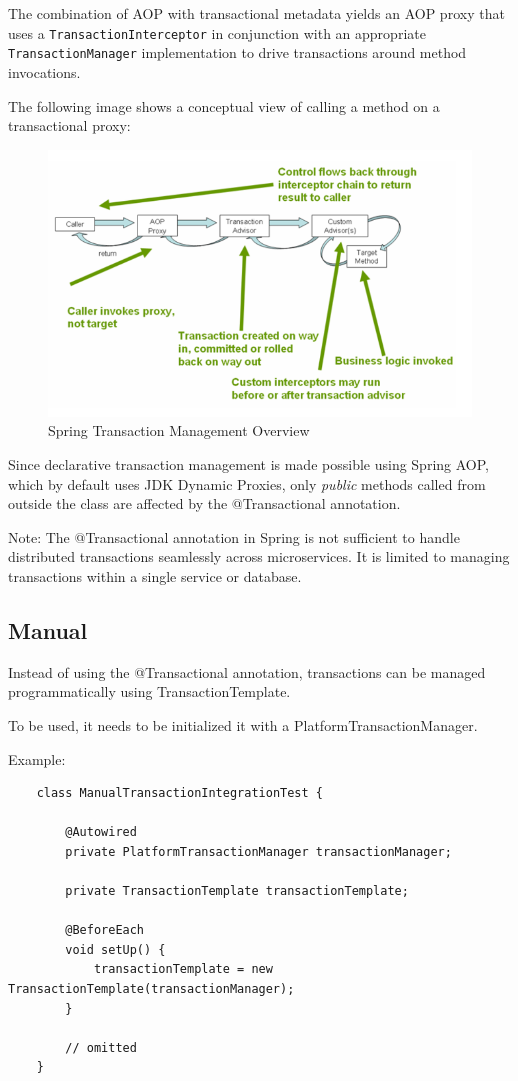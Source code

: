 \documentclass{scrartcl}
\begin{document}
The combination of AOP with transactional metadata yields an AOP proxy that uses a \lstinline|TransactionInterceptor| in conjunction with an appropriate \lstinline|TransactionManager| implementation to drive transactions around method invocations.

The following image shows a conceptual view of calling a method on a transactional proxy:

\begin{figure}[h]
    \centering
    \includegraphics[width=1\linewidth]{transactions-aop}
    \caption{Spring Transaction Management Overview}
    \label{fig:transactions-aop}
\end{figure}

Since declarative transaction management is made possible using Spring AOP, which by default uses JDK Dynamic Proxies, only \textit{public} methods called from outside the class are affected by the @Transactional annotation.

Note: The @Transactional annotation in Spring is not sufficient to handle distributed transactions seamlessly across microservices. It is limited to managing transactions within a single service or database.


\subsection{Manual}

Instead of using the @Transactional annotation, transactions can be managed programmatically using TransactionTemplate.

To be used, it needs to be initialized it with a PlatformTransactionManager.

Example:

\begin{lstlisting}
    class ManualTransactionIntegrationTest {

        @Autowired
        private PlatformTransactionManager transactionManager;

        private TransactionTemplate transactionTemplate;

        @BeforeEach
        void setUp() {
            transactionTemplate = new TransactionTemplate(transactionManager);
        }

        // omitted
    }
\end{lstlisting}
\end{document}
